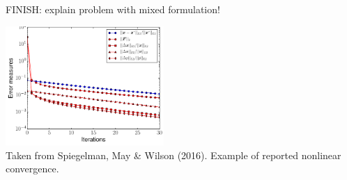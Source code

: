 FINISH: explain problem with mixed formulation!


\begin{center}
\includegraphics[width=6cm]{images/nlconv/spmw16}\\
{\captionfont Taken from Spiegelman, May \& Wilson \etal (2016). Example of 
reported nonlinear convergence.}
\end{center}





